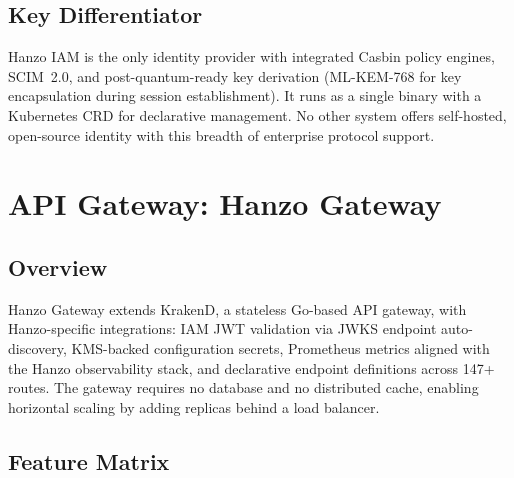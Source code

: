\documentclass[11pt,twocolumn]{article}
\begin{document}
\subsection{Key Differentiator}

Hanzo IAM is the only identity provider with integrated Casbin policy engines, SCIM~2.0, and post-quantum-ready key derivation (ML-KEM-768 for key encapsulation during session establishment). It runs as a single binary with a Kubernetes CRD for declarative management. No other system offers self-hosted, open-source identity with this breadth of enterprise protocol support.

\section{API Gateway: Hanzo Gateway}
\label{sec:gateway}

\subsection{Overview}

Hanzo Gateway extends KrakenD, a stateless Go-based API gateway, with Hanzo-specific integrations: IAM JWT validation via JWKS endpoint auto-discovery, KMS-backed configuration secrets, Prometheus metrics aligned with the Hanzo observability stack, and declarative endpoint definitions across 147+ routes. The gateway requires no database and no distributed cache, enabling horizontal scaling by adding replicas behind a load balancer.

\subsection{Feature Matrix}
\end{document}
